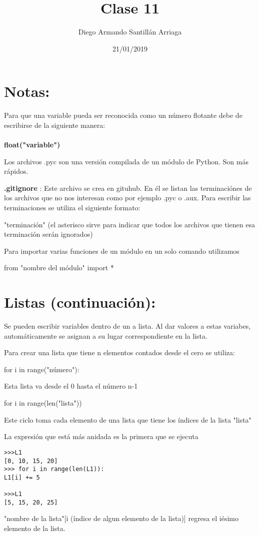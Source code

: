 \documentclass[letter paper, 12pt, oneside]{article}
\title{\Huge Clase 11}
\author{Diego Armando Santillán Arriaga}
\date{21/01/2019}
\begin{document}
	\maketitle	
\newpage
\section{Notas:}
Para que una variable pueda ser reconocida como un número flotante debe de escribirse de la siguiente manera:
\\\\
\textbf{float("variable")}

Los archivos .pyc son una versión compilada de un módulo de Python. Son más rápidos. 

\textbf{.gitignore} : Este archivo se crea en gituhub. En él se listan las terminaciónes de los archivos que no nos interesan como por ejemplo .pyc o .aux. Para escribir las terminaciones se utiliza el siguiente formato:

"terminación" (el asterisco sirve para indicar que todos los archivos que tienen esa terminación serán ignorados)

Para importar varias funciones de un módulo en un solo comando utilizamos

from "nombre del módulo" import * 


\section{Listas (continuación):}
Se pueden escribir variables dentro de un a lista. Al dar valores a estas variabes, automáticamente se asignan a su lugar correspondiente en la lista. 

Para crear una lista que tiene n elementos contados desde el cero se  utiliza:

for i in range("número"):

Esta lista va desde el 0 hasta el número n-1 


for i in  range(len("lista"))

Este ciclo toma cada elemento de una lista que tiene los índices de la lista "lista"

La expresión que está más anidada es la primera que se ejecuta

\begin{verbatim}
>>>L1
[0, 10, 15, 20]
>>> for i in range(len(L1)):
L1[i] += 5

>>>L1
[5, 15, 20, 25]
\end{verbatim}

"nombre de la lista"[i (índice de algun elemento de la lista)] regresa el iésimo elemento de la lista. 
\end{document}
